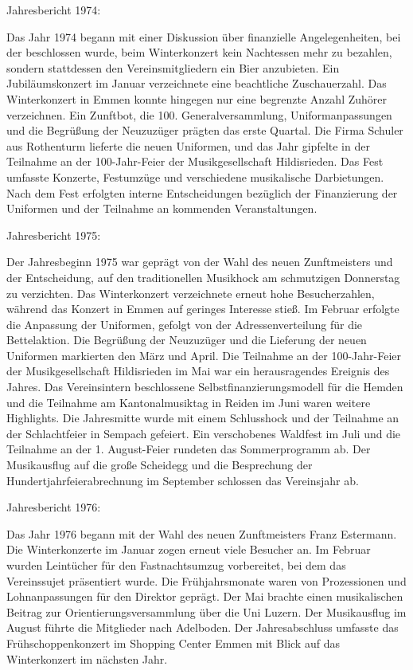 Jahresbericht 1974:

Das Jahr 1974 begann mit einer Diskussion über finanzielle Angelegenheiten, bei
der beschlossen wurde, beim Winterkonzert kein Nachtessen mehr zu bezahlen,
sondern stattdessen den Vereinsmitgliedern ein Bier anzubieten. Ein
Jubiläumskonzert im Januar verzeichnete eine beachtliche Zuschauerzahl. Das
Winterkonzert in Emmen konnte hingegen nur eine begrenzte Anzahl Zuhörer
verzeichnen. Ein Zunftbot, die 100. Generalversammlung, Uniformanpassungen und
die Begrüßung der Neuzuzüger prägten das erste Quartal. Die Firma Schuler aus
Rothenturm lieferte die neuen Uniformen, und das Jahr gipfelte in der Teilnahme
an der 100-Jahr-Feier der Musikgesellschaft Hildisrieden. Das Fest umfasste
Konzerte, Festumzüge und verschiedene musikalische Darbietungen. Nach dem Fest
erfolgten interne Entscheidungen bezüglich der Finanzierung der Uniformen und
der Teilnahme an kommenden Veranstaltungen.

Jahresbericht 1975:

Der Jahresbeginn 1975 war geprägt von der Wahl des neuen Zunftmeisters und der
Entscheidung, auf den traditionellen Musikhock am schmutzigen Donnerstag zu
verzichten. Das Winterkonzert verzeichnete erneut hohe Besucherzahlen, während
das Konzert in Emmen auf geringes Interesse stieß. Im Februar erfolgte die
Anpassung der Uniformen, gefolgt von der Adressenverteilung für die
Bettelaktion. Die Begrüßung der Neuzuzüger und die Lieferung der neuen Uniformen
markierten den März und April. Die Teilnahme an der 100-Jahr-Feier der
Musikgesellschaft Hildisrieden im Mai war ein herausragendes Ereignis des
Jahres. Das Vereinsintern beschlossene Selbstfinanzierungsmodell für die Hemden
und die Teilnahme am Kantonalmusiktag in Reiden im Juni waren weitere
Highlights. Die Jahresmitte wurde mit einem Schlusshock und der Teilnahme an der
Schlachtfeier in Sempach gefeiert. Ein verschobenes Waldfest im Juli und die
Teilnahme an der 1. August-Feier rundeten das Sommerprogramm ab. Der
Musikausflug auf die große Scheidegg und die Besprechung der
Hundertjahrfeierabrechnung im September schlossen das Vereinsjahr ab.

Jahresbericht 1976:

Das Jahr 1976 begann mit der Wahl des neuen Zunftmeisters Franz Estermann. Die
Winterkonzerte im Januar zogen erneut viele Besucher an. Im Februar wurden
Leintücher für den Fastnachtsumzug vorbereitet, bei dem das Vereinssujet
präsentiert wurde. Die Frühjahrsmonate waren von Prozessionen und
Lohnanpassungen für den Direktor geprägt. Der Mai brachte einen musikalischen
Beitrag zur Orientierungsversammlung über die Uni Luzern. Der Musikausflug im
August führte die Mitglieder nach Adelboden. Der Jahresabschluss umfasste das
Frühschoppenkonzert im Shopping Center Emmen mit Blick auf das Winterkonzert im
nächsten Jahr.

